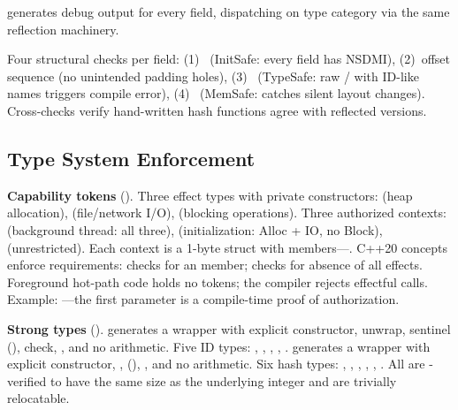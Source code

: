  generates debug output for every field, dispatching on type category via the same reflection machinery.

Four structural checks per field:
(1)~ (InitSafe: every field has NSDMI),
(2)~offset sequence (no unintended padding holes),
(3)~ (TypeSafe: raw / with ID-like names triggers compile error),
(4)~ (MemSafe: catches silent layout changes).
Cross-checks verify hand-written hash functions agree with reflected versions.

\subsection{Type System Enforcement}

\textbf{Capability tokens} ().
Three effect types with private constructors:  (heap allocation),  (file/network I/O),  (blocking operations).
Three authorized contexts:  (background thread: all three),  (initialization: Alloc + IO, no Block),  (unrestricted).
Each context is a 1-byte struct with  members---.
C++20 concepts enforce requirements:  checks for an  member;  checks for absence of all effects.
Foreground hot-path code holds no tokens; the compiler rejects effectful calls.
Example: ---the first parameter is a compile-time proof of authorization.

\textbf{Strong types} ().
 generates a  wrapper with explicit constructor,  unwrap,  sentinel (),  check, , and no arithmetic.
Five ID types: , , , , .
 generates a  wrapper with explicit constructor, ,  (), , and no arithmetic.
Six hash types: , , , , , .
All are -verified to have the same size as the underlying integer and are trivially relocatable.

